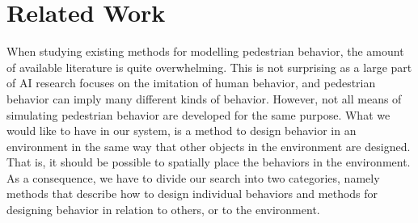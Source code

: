 \documentclass[11pt, a4paper]{book}
\begin{document}


\chapter{Related Work}
When studying existing methods for modelling pedestrian behavior, the amount of available literature is quite overwhelming. This is not surprising as a large part of AI research focuses on the imitation of human behavior, and pedestrian behavior can imply many different kinds of behavior. However, not all means of simulating pedestrian behavior are developed for the same purpose. What we would like to have in our system, is a method to design behavior in an environment in the same way that other objects in the environment are designed. That is, it should be possible to spatially place the behaviors in the environment. As a consequence, we have to divide our search into two categories, namely methods that describe how to design individual behaviors and methods for designing behavior in relation to others, or to the environment.
\end{document}
